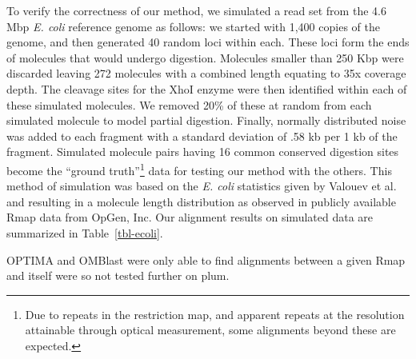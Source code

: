To verify the correctness of our method, we simulated a read set from the 4.6 Mbp \emph{E. coli} reference genome as follows:  we started with 1,400 copies of the genome, and then generated 40 random loci within each. These loci form the ends of molecules that would undergo digestion.  Molecules smaller than 250 Kbp were discarded leaving 272 molecules with a combined length equating to 35x coverage depth.  The cleavage sites for the XhoI enzyme were then identified within each of these simulated molecules. We removed 20\% of these at random from each simulated molecule to model partial digestion.  Finally, normally distributed noise was added to each fragment with a standard deviation of .58 kb per 1 kb of the fragment.  Simulated molecule pairs having 16 common conserved digestion sites become the ``ground truth''\footnote{Due to repeats in the restriction map, and apparent repeats at the resolution attainable through optical measurement, some alignments beyond these are expected.} data for testing our method with the others.  This method of simulation was based on the \emph{E. coli} statistics given by Valouev et al.~\cite{valouev2006algorithm} and resulting in a molecule length distribution as observed in publicly available Rmap data from OpGen, Inc.
Our  alignment results on simulated data are summarized in Table~\ref{tbl-ecoli}.  %


OPTIMA and OMBlast were only able to find alignments between a given Rmap and itself were so not tested further on plum.  


